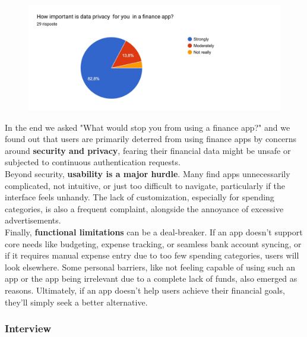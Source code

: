 \documentclass[a4paper,12pt]{article}
\begin{document}
\begin{figure}[H]
    \centering
    \includegraphics[width=\linewidth]{imagequest8.jpg}
\end{figure}
\noindent In the end we asked "What would stop you from using a finance app?" and we found out that users are primarily deterred from using finance apps by concerns around \textbf{security and privacy}, fearing their financial data might be unsafe or subjected to continuous authentication requests.
\vspace{0.5cm}\\
Beyond security, \textbf{usability is a major hurdle}. Many find apps unnecessarily complicated, not intuitive, or just too difficult to navigate, particularly if the interface feels unhandy. The lack of customization, especially for spending categories, is also a frequent complaint, alongside the annoyance of excessive advertisements.
\vspace{0.5cm}\\
Finally, \textbf{functional limitations} can be a deal-breaker. If an app doesn't support core needs like budgeting, expense tracking, or seamless bank account syncing, or if it requires manual expense entry due to too few spending categories, users will look elsewhere. Some personal barriers, like not feeling capable of using such an app or the app being irrelevant due to a complete lack of funds, also emerged as reasons. Ultimately, if an app doesn't help users achieve their financial goals, they'll simply seek a better alternative.
\subsubsection{Interview}
\end{document}
